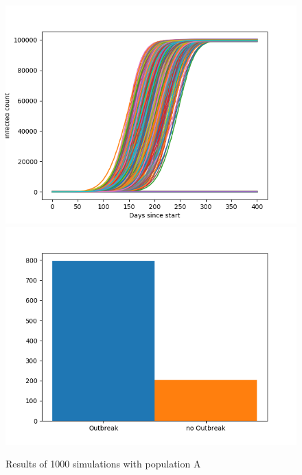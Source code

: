 \documentclass[runningheads]{llncs}
\begin{document}
\begin{figure}
	\includegraphics[width=\textwidth]{outbreaks_populationA.png}
	\includegraphics[width=\textwidth]{barchart_populationA.png}
	\caption{Results of 1000 simulations with population A}
\end{figure}
\end{document}
